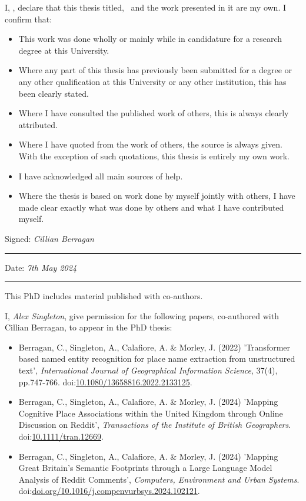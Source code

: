 \noindent I, \authorname, declare that this thesis titled, \ttitle\ and the work presented in it are my own. I confirm that:

\begin{itemize}
\item This work was done wholly or mainly while in candidature for a research degree at this University.
\item Where any part of this thesis has previously been submitted for a degree or any other qualification at this University or any other institution, this has been clearly stated.
\item Where I have consulted the published work of others, this is always clearly attributed.
\item Where I have quoted from the work of others, the source is always given. With the exception of such quotations, this thesis is entirely my own work.
\item I have acknowledged all main sources of help.
\item Where the thesis is based on work done by myself jointly with others, I have made clear exactly what was done by others and what I have contributed myself.\\
\end{itemize}
 
\noindent Signed: \textit{Cillian Berragan}\\
\rule[0.5em]{25em}{0.5pt} %
 
\noindent Date: \textit{7th May 2024}\\
\rule[0.5em]{25em}{0.5pt} %

\newpage

This PhD includes material published with co-authors.

I, \textit{Alex Singleton}, give permission for the following papers, co-authored with Cillian Berragan, to appear in the PhD thesis:

\begin{itemize}
\item Berragan, C., Singleton, A., Calafiore, A. \& Morley, J. (2022) 'Transformer based named entity recognition for place name extraction from unstructured text', \textit{International Journal of Geographical Information Science}, 37(4), pp.747-766. doi:\href{https://doi.org/10.1080/13658816.2022.2133125}{10.1080/13658816.2022.2133125}.
\item Berragan, C., Singleton, A., Calafiore, A. \& Morley, J. (2024) 'Mapping Cognitive Place Associations within the United Kingdom through Online Discussion on Reddit', \textit{Transactions of the Institute of British Geographers}. doi:\href{https://doi.org/10.1111/tran.12669}{10.1111/tran.12669}.
\item Berragan, C., Singleton, A., Calafiore, A. \& Morley, J. (2024) 'Mapping Great Britain's Semantic Footprints through a Large Language Model Analysis of Reddit Comments', \textit{Computers, Environment and Urban Systems}. doi:\href{https://doi.org/10.1016/j.compenvurbsys.2024.102121}{doi.org/10.1016/j.compenvurbsys.2024.102121}.\\
\end{itemize}

